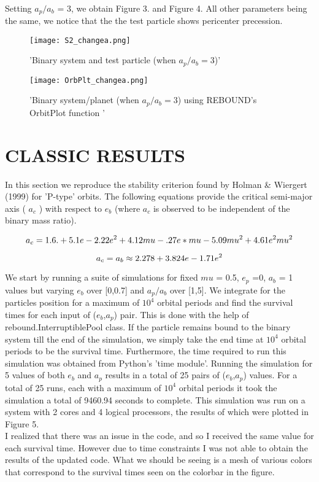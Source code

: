 \documentclass{article}
\begin{document}
\\ Setting $a_p/a_b$ = 3, we obtain Figure 3. and Figure 4. All other parameters being the same, we notice that the the test particle shows pericenter precession.

\begin{figure}[htbp]
\texttt{[image: S2\_changea.png]}
\caption{'Binary system and test particle (when $a_p/a_b = 3$)'}
\end{figure}

\begin{figure}[htbp]
\texttt{[image: OrbPlt\_changea.png]}
\caption{'Binary system/planet (when $a_p/a_b = 3$) using REBOUND's OrbitPlot function '}
\end{figure}

\newpage

\section{CLASSIC RESULTS}

In this section we reproduce the stability criterion found by Holman \& Wiergert (1999) for 'P-type' orbits. The following equations provide the critical semi-major axis ( $a_c$ ) with respect to $e_b$ (where $a_c$ is observed to be independent of the binary mass ratio).

\begin{equation}
\displaystyle
\\a_c = 1.6.+ 5.1e-2.22e^2 + 4.12mu-.27e*mu-5.09mu^2 + 4.61e^2mu^2
\end{equation}

\begin{equation}
\displaystyle
\\a_c = a_b \approx 2.278 + 3.824e - 1.71e^2
\end{equation}

We start by running a suite of simulations for fixed $mu$ = 0.5, $e_p$ =0, $a_b$ = 1 values but varying $e_b$ over [0,0.7] and $a_p/a_b$ over [1,5]. We integrate for the particles position for a maximum of $10^4$ orbital periods and find the survival times for each input of ($e_b$,$a_p$) pair. This is done with the help of rebound.InterruptiblePool class. If the particle remains bound to the binary system till the end of the simulation, we simply take the end time at $10^4$ orbital periods to be the survival time.
Furthermore, the time required to run this simulation was obtained from Python's 'time module'. Running the simulation for 5 values of both $e_b$ and $a_p$ results in a total of 25 pairs of ($e_b$,$a_p$) values. For a total of 25 runs, each with a maximum of $10^4$ orbital periods it took  the simulation a total of 9460.94 seconds to complete. This simulation was run on a system with 2 cores and 4 logical processors, the results of which were plotted in Figure 5. 
\\
I realized that there was an issue in the code, and so I received the same value for each survival time. However due to time constraints I was not able to obtain the results of the updated code. What we should be seeing is a mesh of various colors that correspond to the survival times seen on the colorbar in the figure.
\end{document}
